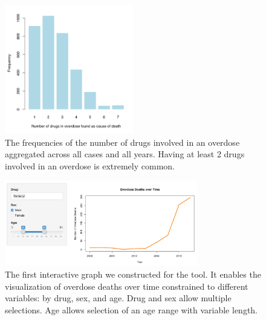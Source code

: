\documentclass{article}
\begin{document}
\begin{figure}[h]
\centering
\includegraphics[width=0.5\textwidth]{numdrugs.png}
\caption{The frequencies of the number of drugs involved in an overdose aggregated across all cases and all years. Having at least 2 drugs involved in an overdose is extremely common.}
\label{fig:numdrugs}
\end{figure}

\begin{figure}[h]
\centering
\includegraphics[width=0.75\textwidth]{timeline.png}
\caption{The first interactive graph we constructed for the tool. It enables the visualization of overdose deaths over time constrained to different variables: by drug, sex, and age. Drug and sex allow multiple selections. Age allows selection of an age range with variable length.}
\label{fig:timeline}
\end{figure}
\end{document}
